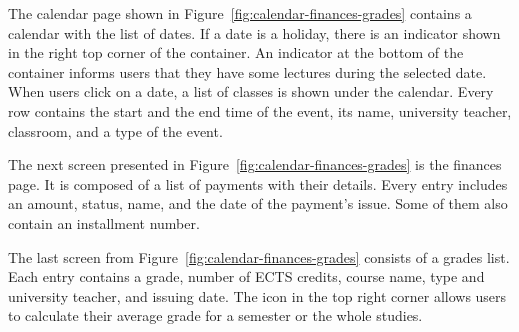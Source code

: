 The calendar page shown in Figure~\ref{fig:calendar-finances-grades} contains a calendar with the list of dates. If a date is a holiday, there is an indicator shown in the right top corner of the container. An indicator at the bottom of the container informs users that they have some lectures during the selected date.
When users click on a date, a list of classes is shown under the calendar. Every row contains the start and the end time of the event, its name, university teacher, classroom, and a type of the event.

The next screen presented in Figure~\ref{fig:calendar-finances-grades} is the finances page. It is composed of a list of payments with their details. Every entry includes an amount, status, name, and the date of the payment's issue. Some of them also contain an installment number.

The last screen from Figure~\ref{fig:calendar-finances-grades} consists of a grades list. Each entry contains a grade, number of ECTS credits, course name, type and university teacher, and issuing date. The icon in the top right corner allows users to calculate their average grade for a semester or the whole studies.

